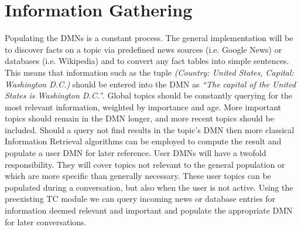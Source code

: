 \documentclass[10pt,twoside,twocolumn]{article}
\begin{document}
\section{Information Gathering \label{section_info}}
Populating the DMNs is a constant process. The general implementation will be to discover facts on a topic via predefined news sources (i.e. Google News) or databases (i.e. Wikipedia) and to convert any fact tables into simple sentences. This means that information such as the tuple \emph{(Country: United States, Capital: Washington D.C.)} should be entered into the DMN as \emph{``The capital of the United States is Washington D.C.''}. Global topics should be constantly querying for the most relevant information, weighted by importance and age. More important topics should remain in the DMN longer, and more recent topics should be included. Should a query not find results in the topic's DMN then more classical Information Retrieval algorithms can be employed to compute the result and populate a user DMN for later reference. User DMNs will have a twofold responsibility. They will cover topics not relevant to the general population or which are more specific than generally necessary.
These user topics can be populated during a conversation, but also when the user is not active. Using the preexisting TC module we can query incoming news or database entries for information deemed relevant and important and populate the appropriate DMN for later conversations. 


 
\end{document}

